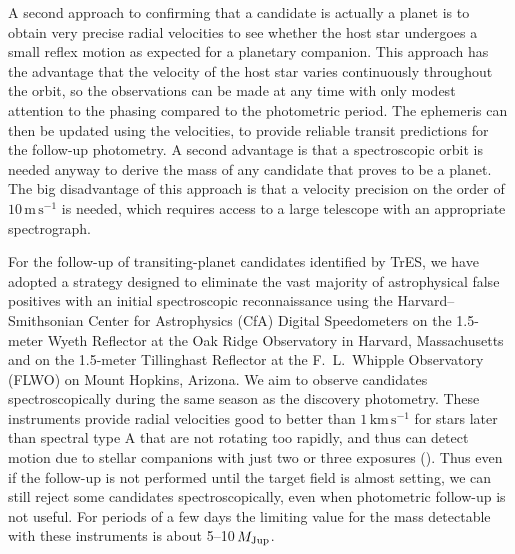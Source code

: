 A second approach to confirming that a candidate is actually a planet is to obtain very precise radial velocities to see whether the host star undergoes a small reflex motion as expected for a planetary companion. This approach has the advantage that the velocity of the host star varies continuously throughout the orbit, so the observations can be made at any time with only modest attention to the phasing compared to the photometric period.  The ephemeris can then be updated using the velocities, to provide reliable transit predictions for the follow-up photometry. A second advantage is that a spectroscopic orbit is needed anyway to derive the mass of any candidate that proves to be a planet.  The big disadvantage of this approach is that a velocity precision on the order of $10\,\mathrm{m\,s^{-1}}$ is needed, which requires access to a large telescope with an appropriate spectrograph.

For the follow-up of transiting-planet candidates identified by TrES, we have adopted a strategy designed to eliminate the vast majority of astrophysical false positives with an initial spectroscopic reconnaissance using the Harvard--Smithsonian Center for Astrophysics (CfA) Digital Speedometers \citep{Latham:ASP:1992a} on the 1.5-meter Wyeth Reflector at the Oak Ridge Observatory in Harvard, Massachusetts and on the 1.5-meter Tillinghast Reflector at the F.~L.~Whipple Observatory (FLWO) on Mount Hopkins, Arizona. We aim to observe candidates spectroscopically during the same season as the discovery photometry. These instruments provide radial velocities good to better than $1\,\mathrm{km\,s^{-1}}$ for stars later than spectral type A that are not rotating too rapidly, and thus can detect motion due to stellar companions with just two or three exposures (\citealp[see, e.g.,][]{Latham:ASP:2003a, Charbonneau_Brown_Dunham:AIP:2004a}). Thus even if the follow-up is not performed until the target field is almost setting, we can still reject some candidates spectroscopically, even when photometric follow-up is not useful. For periods of a few days the limiting value for the mass detectable with these instruments is about 5--10\,$M_{\rm Jup}$.  

